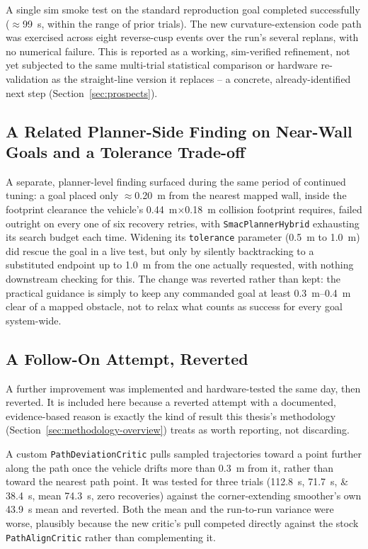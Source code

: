 A single sim smoke test on the standard reproduction goal completed
successfully ($\approx$\SI{99}{\second}, within the range of prior
trials). The new curvature-extension code path was exercised across
eight reverse-cusp events over the run's several replans, with no
numerical failure. This is reported as a working, sim-verified
refinement, not yet subjected to the same multi-trial statistical
comparison or hardware re-validation as the straight-line version it
replaces -- a concrete, already-identified next step
(Section~\ref{sec:prospects}).

\subsection{A Related Planner-Side Finding on Near-Wall Goals and a Tolerance Trade-off}
\label{sec:near-wall-tolerance}

A separate, planner-level finding surfaced during the same period of
continued tuning: a goal placed only $\approx$\SI{0.20}{\meter} from
the nearest mapped wall, inside the footprint clearance the vehicle's
\SI{0.44}{\meter}$\times$\SI{0.18}{\meter} collision footprint
requires, failed outright on every one of six recovery retries, with
\texttt{SmacPlannerHybrid} exhausting its search budget each time.
Widening its \texttt{tolerance} parameter (\SI{0.5}{\meter} to
\SI{1.0}{\meter}) did rescue the goal in a live test, but only by
silently backtracking to a substituted endpoint up to \SI{1.0}{\meter}
from the one actually requested, with nothing downstream checking for
this. The change was reverted rather than kept: the practical guidance
is simply to keep any commanded goal at least
\SIrange{0.3}{0.4}{\meter} clear of a mapped obstacle, not to relax
what counts as success for every goal system-wide.

\subsection{A Follow-On Attempt, Reverted}
\label{sec:cusp-followon-reverted}

A further improvement was implemented and hardware-tested the same
day, then reverted. It is included here because a
reverted attempt with a documented, evidence-based reason is exactly
the kind of result this thesis's methodology
(Section~\ref{sec:methodology-overview}) treats as worth reporting,
not discarding.

A custom \texttt{PathDeviationCritic} pulls sampled trajectories
toward a point further along the path once the vehicle drifts more
than \SI{0.3}{\meter} from it, rather than toward the nearest path
point. It was tested for three trials
(\SIlist{112.8;71.7;38.4}{\second}, mean \SI{74.3}{\second}, zero
recoveries) against the corner-extending smoother's own
\SI{43.9}{\second} mean and reverted. Both the mean and the
run-to-run variance were worse, plausibly because the new critic's
pull competed directly against the stock \texttt{PathAlignCritic}
rather than complementing it.

